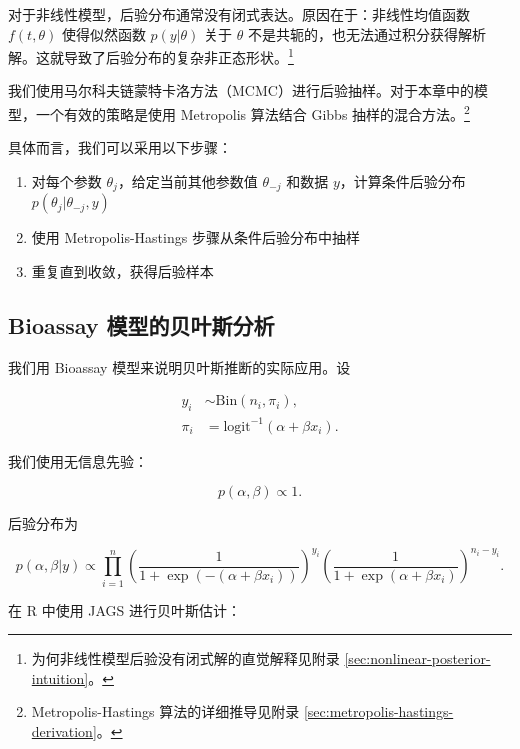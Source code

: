 对于非线性模型，后验分布通常没有闭式表达。原因在于：非线性均值函数 $f(t, \theta)$ 使得似然函数 $p(y | \theta)$ 关于 $\theta$ 不是共轭的，也无法通过积分获得解析解。这就导致了后验分布的复杂非正态形状。\footnote{为何非线性模型后验没有闭式解的直觉解释见附录 \cref{sec:nonlinear-posterior-intuition}。}

我们使用马尔科夫链蒙特卡洛方法（MCMC）进行后验抽样。对于本章中的模型，一个有效的策略是使用 Metropolis 算法结合 Gibbs 抽样的混合方法。\footnote{Metropolis-Hastings 算法的详细推导见附录 \cref{sec:metropolis-hastings-derivation}。}

具体而言，我们可以采用以下步骤：

\begin{enumerate}
  \item 对每个参数 $\theta_j$，给定当前其他参数值 $\theta_{-j}$ 和数据 $y$，计算条件后验分布 $p(\theta_j | \theta_{-j}, y)$
  \item 使用 Metropolis-Hastings 步骤从条件后验分布中抽样
  \item 重复直到收敛，获得后验样本
\end{enumerate}

\subsection{Bioassay 模型的贝叶斯分析}\label{sec:bioassay-bayesian}

我们用 Bioassay 模型来说明贝叶斯推断的实际应用。设

\begin{align}
y_i &\sim \mathrm{Bin}(n_i, \pi_i), \label{eq:bioassay-likelihood} \\
\pi_i &= \mathrm{logit}^{-1}(\alpha + \beta x_i). \label{eq:bioassay-pi}
\end{align}

我们使用无信息先验：

\begin{equation}
p(\alpha, \beta) \propto 1. \label{eq:bioassay-prior}
\end{equation}

后验分布为

\begin{equation}
p(\alpha, \beta | y) \propto \prod_{i=1}^{n} \left(\frac{1}{1 + \exp(-(\alpha + \beta x_i))}\right)^{y_i} \left(\frac{1}{1 + \exp(\alpha + \beta x_i)}\right)^{n_i - y_i}. \label{eq:bioassay-posterior}
\end{equation}

在 R 中使用 JAGS 进行贝叶斯估计：

